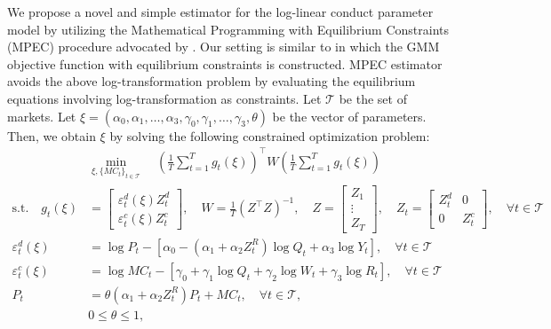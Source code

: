 \documentclass[11pt, a4paper]{article}
\begin{document}
We propose a novel and simple estimator for the log-linear conduct parameter model by utilizing the Mathematical Programming with Equilibrium Constraints (MPEC) procedure advocated by \cite{su2012constrained}. Our setting is similar to \cite{dube2012improving} in which the GMM objective function with equilibrium constraints is constructed. 
MPEC estimator avoids the above log-transformation problem by evaluating the equilibrium equations involving log-transformation as constraints.
Let $\mathcal{T}$ be the set of markets. Let $\xi = (\alpha_0,\alpha_1, \ldots, \alpha_3, \gamma_0,\gamma_1, \ldots, \gamma_3, \theta)$ be the vector of parameters. Then, we obtain $\xi$ by solving the following constrained optimization problem:
\begin{align}
    &\min_{\xi, \{MC_t\}_{t\in \mathcal{T}}}\quad \left(\frac{1}{T}\sum_{t=1}^{T}g_{t}(\xi)\right)^{\top} W\left(\frac{1}{T}\sum_{t=1}^{T}g_{t}(\xi)\right) \label{eq:objective_gmm}\\
    \text{s.t.}\quad g_{t}(\xi)&=\left[\begin{array}{l}
\varepsilon^{d}_{t}(\xi)Z_{t}^{d} \\
\varepsilon^{c}_{t}(\xi)Z_{t}^{c}
\end{array}\right], \quad W=\frac{1}{T}(Z^\top Z)^{-1}, \quad Z=\left[\begin{array}{c}
Z_{1} \\
\vdots \\
Z_{T}
\end{array}\right],\quad Z_{t}=\left[\begin{array}{ll}
Z_{t}^{d} & 0 \\
0 & Z_{t}^{c}
\end{array}\right],\quad  \forall t \in \mathcal{T}\nonumber\\
    \varepsilon^{d}_{t}(\xi)&=\log P_{t} -[\alpha_0 - (\alpha_1 + \alpha_2 Z^{R}_{t}) \log Q_t + \alpha_3 \log Y_t],\quad  \forall t \in \mathcal{T} \label{eq:demand_gmm}\\
    \varepsilon^{c}_{t} (\xi)&= \log MC_t -[\gamma_0 + \gamma_1 \log Q_t +  \gamma_2 \log W_{t} + \gamma_3 \log R_t],\quad  \forall t \in \mathcal{T}\label{eq:supply_gmm}\\
    P_t &= \theta (\alpha_1 + \alpha_2 Z^{R}_{t})P_t + MC_t,\quad  \forall t \in \mathcal{T},\label{eq:equilibrium_constraint}\\
    &0\le\theta \le 1,
    \label{eq:parameter_constraint}
\end{align}
\end{document}
